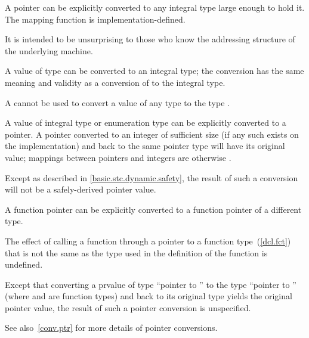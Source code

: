 \pnum
{}%
%
A pointer can be explicitly converted to any integral type large enough
to hold it.
%
The mapping function is implementa\-tion-defined.
\begin{note}
It is intended to be unsurprising to those who know the addressing
structure of the underlying machine.
\end{note} A value of type  can be converted to an integral
type; the conversion has the same meaning and validity as a conversion of
 to the integral type. \begin{note} A 
cannot be used to convert a value of any type to the type
. \end{note}

\pnum
{}%
%
A value of integral type or enumeration type can be explicitly converted
to a pointer. A pointer converted to an integer of sufficient size (if
any such exists on the implementation) and back to the same pointer type
will have its original value;
%
mappings between pointers and integers are otherwise
.
\begin{note} Except as described in \ref{basic.stc.dynamic.safety}, the result of
such a conversion will not be a safely-derived pointer value. \end{note}

\pnum
{}%
%
%
A function pointer can be explicitly converted
to a function pointer of a different type.
%
\begin{note}
The effect of calling a function through a pointer to a function
type~(\ref{dcl.fct}) that is not the same as the type used in the
definition of the function is undefined.
\end{note}
Except that converting
a prvalue of type ``pointer to '' to the type ``pointer to
'' (where  and  are function types) and
back to its original type yields the original pointer value, the result
of such a pointer conversion is unspecified.
\begin{note}
See also~\ref{conv.ptr} for more details of pointer conversions.
\end{note}

